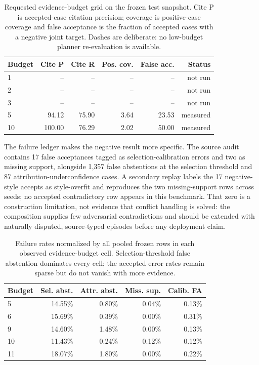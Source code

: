 \documentclass[11pt,a4paper]{article}
\begin{document}
\begin{table}[t]
\centering
\scriptsize
\setlength{\tabcolsep}{2pt}
\begin{tabular}{lrrrrr}
\toprule
Budget & Cite P & Cite R & Pos. cov. & False acc. & Status \\
\midrule
1 & -- & -- & -- & -- & not run \\
2 & -- & -- & -- & -- & not run \\
3 & -- & -- & -- & -- & not run \\
5 & 94.12 & 75.90 & 3.64 & 23.53 & measured \\
10 & 100.00 & 76.29 & 2.02 & 50.00 & measured \\
\bottomrule
\end{tabular}
\caption{Requested evidence-budget grid on the frozen test snapshot. Cite P
is accepted-case citation precision; coverage is positive-case coverage and
false acceptance is the fraction of accepted cases with a negative joint
target. Dashes are deliberate: no low-budget planner re-evaluation is
available.}
\label{tab:requested-budget}
\end{table}

The failure ledger makes the negative result more specific.  The source audit
contains 17 false acceptances tagged as selection-calibration errors and two
as missing support, alongside 1,357 false abstentions at the selection
threshold and 87 attribution-underconfidence cases.  A secondary replay
labels the 17 negative-style accepts as style-overfit and reproduces the two
missing-support rows across seeds; no accepted contradictory row appears in
this benchmark.  That zero is a construction limitation, not evidence that
conflict handling is solved: the composition supplies few adversarial
contradictions and should be extended with naturally disputed, source-typed
episodes before any deployment claim.

\begin{table}[t]
\centering
\scriptsize
\begin{tabular}{lrrrr}
\toprule
Budget & Sel. abst. & Attr. abst. & Miss. sup. & Calib. FA \\
\midrule
5  & 14.55\% & 0.80\% & 0.04\% & 0.13\% \\
6  & 15.69\% & 0.39\% & 0.00\% & 0.31\% \\
9  & 14.60\% & 1.48\% & 0.00\% & 0.13\% \\
10 & 11.43\% & 0.24\% & 0.12\% & 0.12\% \\
11 & 18.07\% & 1.80\% & 0.00\% & 0.22\% \\
\bottomrule
\end{tabular}
\caption{Failure rates normalized by all pooled frozen rows in each observed
evidence-budget cell.  Selection-threshold false abstention dominates every
cell; the accepted-error rates remain sparse but do not vanish with more
evidence.}
\label{tab:failure-by-budget}
\end{table}
\end{document}

